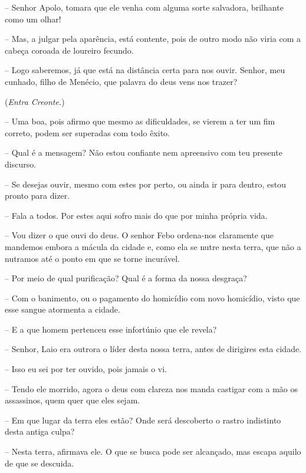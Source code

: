  --    Senhor Apolo, tomara que ele venha com alguma sorte salvadora,
brilhante como um olhar!

 --   Mas, a julgar pela aparência, está contente, pois de outro modo não
viria com a cabeça coroada de loureiro fecundo.

 --   Logo saberemos, já que está na distância certa para nos ouvir. Senhor,
meu cunhado, filho de Menécio, que palavra do deus vens nos trazer?

(\emph{Entra Creonte.})

 --   Uma boa, pois afirmo que mesmo as dificuldades, se vierem a ter um fim
correto, podem ser superadas com todo êxito.

 --    Qual é a mensagem? Não estou confiante nem apreensivo com teu
presente discurso.

 --   Se desejas ouvir, mesmo com estes por perto, ou ainda ir para dentro,
estou pronto para dizer.



 --   Fala a todos. Por estes aqui sofro mais do que por minha própria vida.

 --   Vou dizer o que ouvi do deus. O senhor Febo ordena-nos claramente que
mandemos embora a mácula da cidade e, como ela se nutre nesta terra, que
não a nutramos até o ponto em que se torne incurável.

 --   Por meio de qual purificação? Qual é a forma da nossa desgraça?

 --    Com o banimento, ou o pagamento do homicídio com novo homicídio,
visto que esse sangue atormenta a cidade.

 --   E a que homem pertenceu esse infortúnio que ele revela?

 --   Senhor, Laio era outrora o líder desta nossa terra, antes de dirigires
esta cidade.

 --   Isso eu sei por ter ouvido, pois jamais o vi.

 --   Tendo ele morrido, agora o deus com clareza nos manda castigar com a mão
os assassinos, quem quer que eles sejam.

 --   Em que lugar da terra eles estão? Onde será descoberto o rastro
indistinto desta antiga culpa?

 --    Nesta terra, afirmava ele. O que se busca pode ser alcançado, mas
escapa aquilo de que se descuida.

